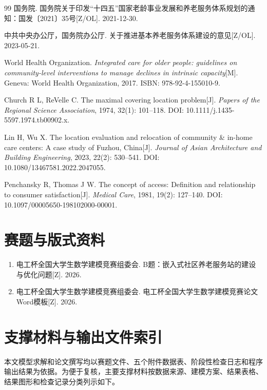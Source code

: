 \begingroup
\small
\begin{thebibliography}{99}
\setlength{\itemsep}{1pt}
  国务院. 国务院关于印发``十四五''国家老龄事业发展和养老服务体系规划的通知：国发〔2021〕35号[Z/OL]. 2021-12-30.

  中共中央办公厅，国务院办公厅. 关于推进基本养老服务体系建设的意见[Z/OL]. 2023-05-21.

  World Health Organization. \textit{Integrated care for older people: guidelines on community-level interventions to manage declines in intrinsic capacity}[M]. Geneva: World Health Organization, 2017. ISBN: 978-92-4-155010-9.

  Church R L, ReVelle C. The maximal covering location problem[J]. \textit{Papers of the Regional Science Association}, 1974, 32(1): 101--118. DOI: 10.1111/j.1435-5597.1974.tb00902.x.

  Lin H, Wu X. The location evaluation and relocation of community \& in-home care centers: A case study of Fuzhou, China[J]. \textit{Journal of Asian Architecture and Building Engineering}, 2023, 22(2): 530--541. DOI: 10.1080/13467581.2022.2047055.

  Penchansky R, Thomas J W. The concept of access: Definition and relationship to consumer satisfaction[J]. \textit{Medical Care}, 1981, 19(2): 127--140. DOI: 10.1097/00005650-198102000-00001.
\end{thebibliography}
\endgroup

\appendix
\section*{赛题与版式资料}

\begin{enumerate}
  \item 电工杯全国大学生数学建模竞赛组委会. B题：嵌入式社区养老服务站的建设与优化问题[Z]. 2026.
  \item 电工杯全国大学生数学建模竞赛组委会. 电工杯全国大学生数学建模竞赛论文Word模板[Z]. 2026.
\end{enumerate}

\section{支撑材料与输出文件索引}

本文模型求解和论文撰写均以赛题文件、五个附件数据表、阶段性检查日志和程序输出结果为依据。为便于复核，主要支撑材料按数据来源、建模方案、结果表格、结果图形和检查记录分类列示如下。


